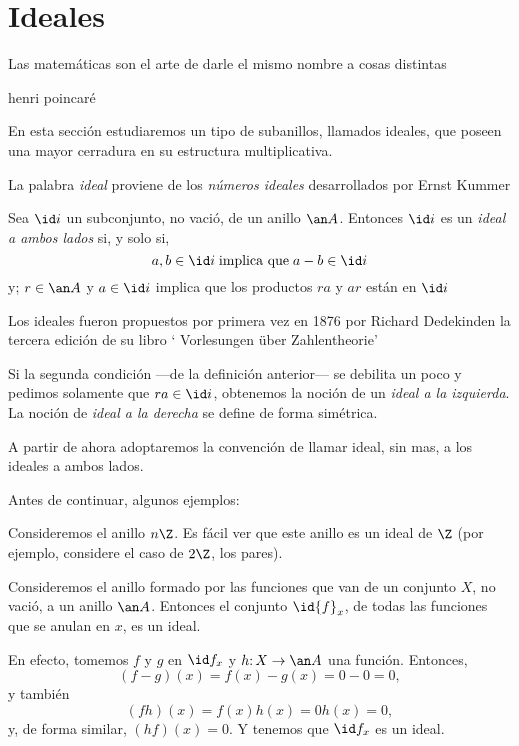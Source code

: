 %
\chapter{Ideales}
\epigraph{Las matemáticas son el arte de darle el mismo nombre a cosas distintas}{henri poincaré}
{\noindent En esta sección estudiaremos un tipo de subanillos, llamados ideales, que poseen una mayor cerradura en su estructura multiplicativa. }

\begin{nota}
	La palabra \textit{ideal} proviene de los \textit{números ideales} desarrollados por Ernst Kummer
\end{nota}
\begin{defi}[ideal]
		Sea $\id i$ un subconjunto, no vació, de un anillo $\an A$. Entonces $\id i$ es un {\it ideal a ambos lados} si, y solo si,
		\[a,b \in \id i \;\text{implica que}\; a-b \in \id i\]
		y; 
		$r \in \an A$ y $a \in \id i$ implica que los productos $ra$ y $ar$ están en $\id i$ 
\end{defi} 
\begin{nota}
	Los ideales fueron propuestos por primera vez en 1876 por Richard Dedekind\footnotemark en la tercera edición de su libro ` Vorlesungen über Zahlentheorie'
\end{nota}
%
Si la segunda condición ---de la definición anterior--- se debilita un poco y pedimos solamente que $ra \in\id i$, obtenemos la noción de un {\it ideal a la izquierda}. La noción de {\it ideal a la derecha} se define de forma simétrica.

A partir de ahora adoptaremos la convención de llamar ideal, sin mas, a los ideales a ambos lados. 

Antes de continuar, algunos ejemplos:
	\begin{ejem} 
			Consideremos el anillo $n\Z$. Es fácil ver que este anillo es un ideal de $\Z$ (por ejemplo, considere el caso de $2\Z$, los pares).
	\end{ejem} 
	\begin{ejem} 
			Consideremos el anillo formado por las funciones que van de un conjunto $X$, no vació, a un anillo $\an A$. Entonces el conjunto $\id{f}_x$, de todas las funciones que se anulan en $x$, es un ideal.
			
			En efecto, tomemos $f$ y $g$ en $\id f_x$ y $h\mathpunct{:} X \to\an A$ una función. Entonces,
			\[ (f-g)(x) = f(x) - g(x) = 0 - 0 = 0, \]
			y también
			\[ (fh)(x) = f(x)h(x) = 0h(x) = 0, \]
			y, de forma similar, $(hf)(x) = 0$. Y tenemos que $\id f_x$ es un ideal.
	\end{ejem} 
%
